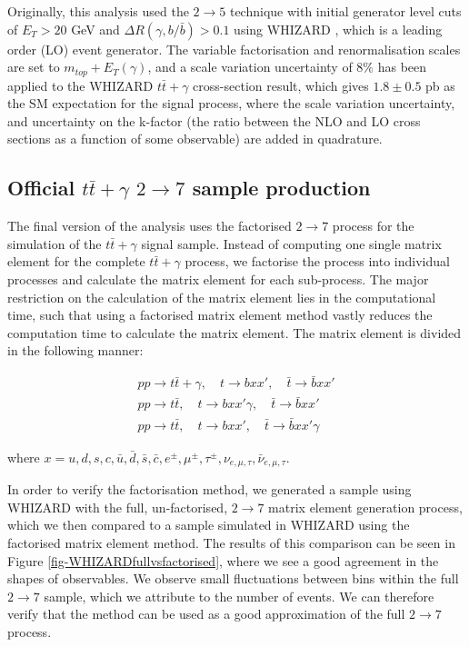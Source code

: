 Originally, this analysis used the $2 \to 5$ technique with initial generator level cuts of $E_T > 20$ GeV and $\Delta R(\gamma, b/\bar{b}) > 0.1$ using WHIZARD \cite{WHIZARD}, which is a leading order (LO) event generator. The variable factorisation and renormalisation scales are set to $m_{top} + E_T(\gamma)$, and a scale variation uncertainty of 8\% has been applied to the WHIZARD $t\bar{t}+\gamma$ cross-section result, which gives $1.8 \pm 0.5$ pb as the SM expectation for the signal process, where the scale variation uncertainty, and uncertainty on the k-factor (the ratio between the NLO and LO cross sections as a function of some observable) are added in quadrature. 


\subsection{Official $t\bar{t}+\gamma$ $2 \to 7$ sample production}

The final version of the analysis uses the factorised $2 \to 7$ process for the simulation of the $t\bar{t}+\gamma$ signal sample. Instead of computing one single matrix element for the complete $t\bar{t}+\gamma$ process, we factorise the process into individual processes and calculate the matrix element for each sub-process. The major restriction on the calculation of the matrix element lies in the computational time, such that using a factorised matrix element method vastly reduces the computation time to calculate the matrix element. The matrix element is divided in the following manner:

\begin{align}
pp \to t\bar{t}+\gamma, \quad t \to bxx', \quad \bar{t} \to \bar{b}xx' \\
pp \to t\bar{t}, \quad t \to bxx'\gamma, \quad \bar{t} \to \bar{b}xx' \\
pp \to t\bar{t}, \quad t \to bxx', \quad \bar{t} \to \bar{b}xx'\gamma 
\end{align}

where $x = u,d,s,c,\bar{u},\bar{d},\bar{s},\bar{c}, e^{\pm}, \mu^{\pm}, \tau^{\pm}, \nu_{e,\mu,\tau}, \bar{\nu}_{e,\mu,\tau}$.

In order to verify the factorisation method, we generated a sample using WHIZARD with the full, un-factorised, $2 \to 7$ matrix element generation process, which we then compared to a sample simulated in WHIZARD using the factorised matrix element method. The results of this comparison can be seen in Figure \ref{fig-WHIZARDfullvsfactorised}, where we see a good agreement in the shapes of observables. We observe small fluctuations between bins within the full $2 \to 7$ sample, which we attribute to the number of events. We can therefore verify that the method can be used as a good approximation of the full $2 \to 7$ process.

